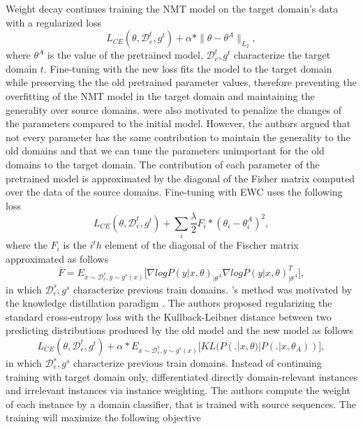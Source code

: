 Weight decay \citep{Miceli17regularization} continues training the NMT model on the target domain's data with a regularized loss 
\begin{equation}
L_{CE}(\theta, \mathcal{D}^t_e, g^t) + \alpha * \parallel \theta - \theta^{A} \parallel_{L_2},
\end{equation}
where $\theta^{A}$ is the value of the pretrained model, $\mathcal{D}^t_e, g^t$ characterize the target domain $t$. Fine-tuning with the new loss fits the model to the target domain while preserving the the old pretrained parameter values, therefore preventing the overfitting of the NMT model in the target domain and maintaining the generality over source domains. \citet{Kirk16overcoming, Brian19overcoming, Saunders19domain} were also motivated to penalize the changes of the parameters compared to the initial model. However, the authors argued that not every parameter has the same contribution to maintain the generality to the old domains and that we can tune the parameters unimportant for the old domains to the target domain. The contribution of each parameter of the pretrained model is approximated by the diagonal of the Fisher matrix computed over the data of the source domains. Fine-tuning with EWC uses the following loss
\begin{equation}
L_{CE}(\theta, \mathcal{D}^t_e, g^t) + \sum_{i} \frac{\lambda}{2} F_i * (\theta_i - \theta_i^{A})^2,
\end{equation}
where the $F_i$ is the $i^th$ element of the diagonal of the Fischer matrix approximated as follows
\begin{equation}
\bar{F} = E_{x \sim \mathcal{D}_e^s, y \sim g^s(x)} \big[ \nabla logP(y|x,\theta)_{| \theta^{A}} \nabla logP(y|x,\theta)_{| \theta^{A}}^{T} \big],
\end{equation}
in which $\mathcal{D}^s_e, g^s$ characterize previous train domains.
\citet{Dakwle17fine}'s method was motivated by the knowledge distillation paradigm \citep{Hinton15Distilling}. The authors proposed regularizing the standard cross-entropy loss with the Kullback-Leibner distance \citep{Kullback51On} between two predicting distributions produced by the old model and the new model as follows
\begin{equation}
L_{CE}(\theta, \mathcal{D}^t_e, g^t) + \alpha * E_{x \sim \mathcal{D}_e^s, y \sim g^s(x)} \big[ KL(P(.|x,\theta) | P(.|x,\theta_{A})) \big],
\end{equation}
in which $\mathcal{D}^s_e, g^s$ characterize previous train domains.
Instead of continuing training with target domain only, \citet{Chen17cost} differentiated directly domain-relevant instances and irrelevant instances via instance weighting. The authors compute the weight of each instance by a domain classifier, that is trained with source sequences. The training will maximize the following objective 
